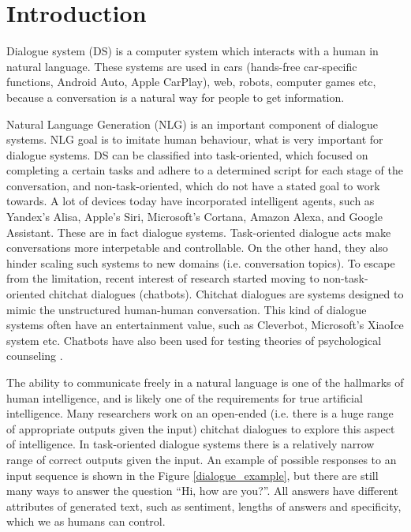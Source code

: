 \chapter{Introduction}\label{introduction}
Dialogue system (DS) is a computer system which interacts with a human in natural language. These systems are used in cars (hands-free car-specific functions, Android Auto, Apple CarPlay), web, robots, computer games etc, because a conversation is a natural way for people to get information. 

Natural Language Generation (NLG) is an important component of dialogue systems. NLG goal is to imitate human behaviour, what is very important for dialogue systems. DS can be classified into task-oriented, which focused on completing a certain tasks and adhere to a determined script for each stage of the conversation, and non-task-oriented, which do not have a stated goal to work towards. A lot of devices today have incorporated intelligent agents, such as Yandex’s Alisa, Apple’s Siri, Microsoft’s Cortana, Amazon Alexa, and Google Assistant. These are in fact dialogue systems. Task-oriented dialogue acts make conversations more interpetable and controllable. On the other hand, they also hinder scaling such systems to new domains (i.e. conversation topics). To escape from the limitation, recent interest of research started moving to non-task-oriented chitchat dialogues (chatbots). Chitchat dialogues are systems designed to mimic the unstructured human-human conversation. This kind of dialogue systems often have an entertainment value, such as Cleverbot, Microsoft's XiaoIce system etc. Chatbots have also been used for testing theories of psychological counseling \cite{vaidyam2019chatbots}.

The ability to communicate freely in a natural language is one of the hallmarks of human intelligence, and is likely one of the requirements for true artificial intelligence. Many researchers work on an open-ended (i.e. there is a huge range of appropriate outputs given the input) chitchat dialogues to explore this aspect of intelligence. In task-oriented dialogue systems there is a relatively narrow range of correct outputs given the input. An example of possible responses to an input sequence is shown in the Figure \ref{dialogue_example}, but there are still many ways to answer the question ``Hi, how are you?''. All answers have different attributes of generated text, such as sentiment, lengths of answers and specificity, which we as humans can control.  

